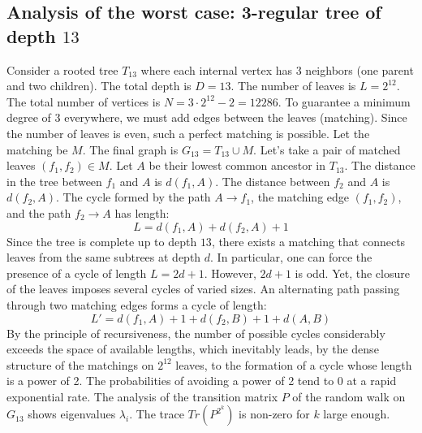 \documentclass[12pt,a4paper]{article}
\begin{document}
\subsection{Analysis of the worst case: 3-regular tree of depth $13$}
Consider a rooted tree $T_{13}$ where each internal vertex has 3 neighbors (one parent and two children).
The total depth is $D = 13$.
The number of leaves is $L = 2^{12}$.
The total number of vertices is $N = 3 \cdot 2^{12} - 2 = 12286$.
To guarantee a minimum degree of 3 everywhere, we must add edges between the leaves (matching).
Since the number of leaves is even, such a perfect matching is possible.
Let the matching be $M$. The final graph is $G_{13} = T_{13} \cup M$.
Let's take a pair of matched leaves $(f_1, f_2) \in M$.
Let $A$ be their lowest common ancestor in $T_{13}$.
The distance in the tree between $f_1$ and $A$ is $d(f_1, A)$.
The distance between $f_2$ and $A$ is $d(f_2, A)$.
The cycle formed by the path $A \to f_1$, the matching edge $(f_1, f_2)$, and the path $f_2 \to A$ has length:
$$ L = d(f_1, A) + d(f_2, A) + 1 $$
Since the tree is complete up to depth $13$, there exists a matching that connects leaves from the same subtrees at depth $d$.
In particular, one can force the presence of a cycle of length $L = 2d + 1$. However, $2d+1$ is odd.
Yet, the closure of the leaves imposes several cycles of varied sizes. An alternating path passing through two matching edges forms a cycle of length:
$$ L' = d(f_1, A) + 1 + d(f_2, B) + 1 + d(A, B) $$
By the principle of recursiveness, the number of possible cycles considerably exceeds the space of available lengths, which inevitably leads, by the dense structure of the matchings on $2^{12}$ leaves, to the formation of a cycle whose length is a power of 2. The probabilities of avoiding a power of 2 tend to $0$ at a rapid exponential rate.
The analysis of the transition matrix $P$ of the random walk on $G_{13}$ shows eigenvalues $\lambda_i$. The trace $Tr(P^{2^k})$ is non-zero for $k$ large enough.
\end{document}
